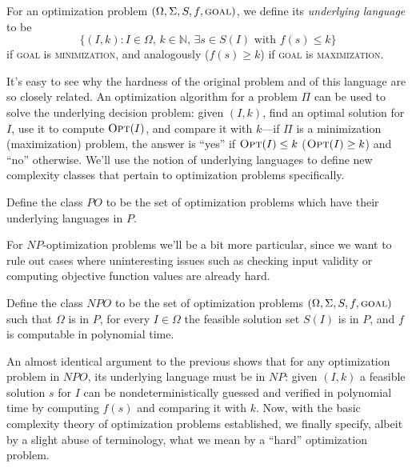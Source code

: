 \documentclass{article}
\newcommand{\N}{\mathbb{N}}
\newenvironment{definition}[2][Definition]{\begin{trivlist}
\item[\hskip \labelsep {\bfseries #1}\hskip \labelsep {\hspace{-1ex}\bfseries #2.}]}{\end{trivlist}}
\begin{document}
\begin{definition}{}{}
    For an optimization problem $(\Omega, \Sigma, S, f, \textsc{goal})$, we define its \textit{underlying language} to be 
    \[
    \big\{(I,k) : I \in \Omega,\, k \in \N,\, \exists s \in S(I) \text{ with } f(s) \leq k \big\}
    \]
    if \textsc{goal} is \textsc{minimization}, and analogously ($f(s) \geq k$) if \textsc{goal} is \textsc{maximization}.
\end{definition}

\noindent It's easy to see why the hardness of the original problem and of this language are so closely related. An optimization algorithm for a problem $\Pi$ can be used to solve the underlying decision problem: given $(I,k)$, find an optimal solution for $I$, use it to compute $\textsc{Opt}(I)$, and compare it with $k$---if $\Pi$ is a minimization (maximization) problem, the answer is ``yes'' if $\textsc{Opt}(I) \leq k$ ($\textsc{Opt}(I) \geq k$) and ``no'' otherwise. We'll use the notion of underlying languages to define new complexity classes that pertain to optimization problems specifically.

\begin{definition}{ ($P$-Optimization Problems)}{}
    Define the class $PO$ to be the set of optimization problems which have their underlying languages in $P$.
\end{definition}

\noindent For $NP$-optimization problems we'll be a bit more particular, since we want to rule out cases where uninteresting issues such as checking input validity or computing objective function values are already hard.

\begin{definition}{ ($NP$-Optimization Problems)}{}
    Define the class $NPO$ to be the set of optimization problems $(\Omega, \Sigma, S, f, \textsc{goal})$ such that $\Omega$ is in $P$, for every $I \in \Omega$ the feasible solution set $S(I)$ is in $P$, and $f$ is computable in polynomial time. 
\end{definition}

\noindent An almost identical argument to the previous shows that for any optimization problem in $NPO$, its underlying language must be in $NP$: given $(I,k)$ a feasible solution $s$ for $I$ can be nondeterministically guessed and verified in polynomial time by computing $f(s)$ and comparing it with $k$. Now, with the basic complexity theory of optimization problems established, we finally specify, albeit by a slight abuse of terminology, what we mean by a ``hard'' optimization problem.
\end{document}
